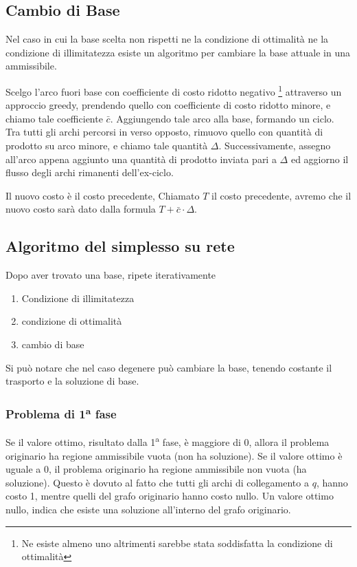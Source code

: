 \documentclass[../template]{subfiles}
\begin{document}
\subsection{Cambio di Base}
Nel caso in cui la base scelta non rispetti ne la condizione di ottimalità ne la condizione di illimitatezza
esiste un algoritmo per cambiare la base attuale in una ammissibile.

Scelgo l'arco fuori base con coefficiente di costo ridotto negativo \footnote{Ne esiste almeno uno altrimenti
sarebbe stata soddisfatta la condizione di ottimalità} attraverso un approccio greedy, prendendo quello con
coefficiente di costo ridotto minore, e chiamo tale coefficiente $\bar{c}$.
Aggiungendo tale arco alla base, formando un ciclo.
Tra tutti gli archi percorsi in verso opposto, rimuovo quello con quantità di prodotto su arco minore, e chiamo
tale quantità $\Delta$. Successivamente, assegno all'arco appena aggiunto una quantità di prodotto inviata
pari a $\Delta$ ed aggiorno il flusso degli archi rimanenti dell'ex-ciclo.

Il nuovo costo è il costo precedente,
Chiamato $T$ il costo precedente, avremo che il nuovo costo sarà dato dalla formula $T + \bar{c} \cdot \Delta$.

\subsection{Algoritmo del simplesso su rete} %
Dopo aver trovato una base, ripete iterativamente
\begin{enumerate}
    \item Condizione di illimitatezza
    \item condizione di ottimalità
    \item cambio di base
\end{enumerate}
Si può notare che nel caso degenere può cambiare la base, tenendo costante il trasporto e la soluzione di base.
\subsubsection{Problema di 1\textsuperscript{a} fase}
Se il valore ottimo, risultato dalla 1\textsuperscript{a} fase, è maggiore di 0, allora il problema originario ha regione
ammissibile vuota (non ha soluzione).
Se il valore ottimo è uguale a 0, il problema originario ha regione ammissibile non vuota (ha soluzione).
Questo è dovuto al fatto che tutti gli archi di collegamento a $q$, hanno costo 1, mentre quelli del
grafo originario hanno costo nullo. Un valore ottimo nullo, indica che esiste una soluzione all'interno del
grafo originario.
\end{document}
